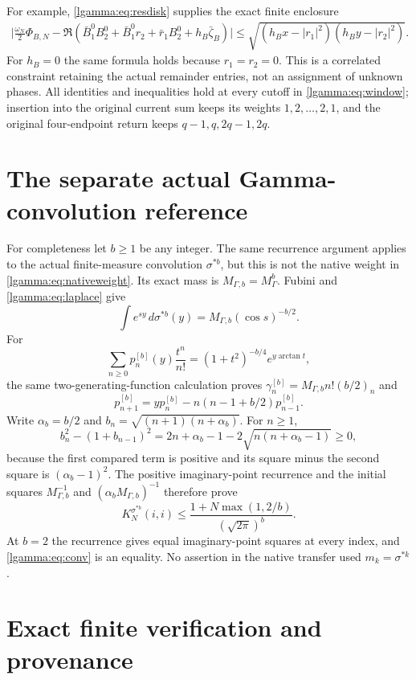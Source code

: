 \documentclass[11pt]{article}
\begin{document}
For example, \eqref{lgamma:eq:resdisk} supplies the exact finite enclosure
\begin{equation}\label{lgamma:eq:currentdisk}
 \begin{split}
 \Big|\frac{\omega_N}2\Phi_{B,N}
 -\Re(\bar B_1^0B_2^0+\bar B_1^0r_2+\bar r_1B_2^0
                   +h_B\bar\zeta_B)\Big|
 \le\sqrt{(h_Bx-|r_1|^2)(h_By-|r_2|^2)}.
 \end{split}
\end{equation}
For $h_B=0$ the same formula holds because $r_1=r_2=0$.
This is a correlated constraint retaining the actual remainder entries,
not an assignment of unknown phases.  All identities and inequalities
hold at every cutoff in \eqref{lgamma:eq:window}; insertion into the original
current sum keeps its weights $1,2,\ldots,2,1$, and the original
four-endpoint return keeps $q-1,q,2q-1,2q$.

\section{The separate actual Gamma-convolution reference}

For completeness let $b\ge1$ be any integer.  The same recurrence
argument applies to the actual finite-measure convolution $\sigma^{*b}$,
but this is not the native weight in \eqref{lgamma:eq:nativeweight}.  Its exact
mass is $M_{\Gamma,b}=M_\Gamma^b$.  Fubini and \eqref{lgamma:eq:laplace} give
\[
 \int e^{sy}\,d\sigma^{*b}(y)=M_{\Gamma,b}(\cos s)^{-b/2}.
\]
For
\[
 \sum_{n\ge0}p_n^{[b]}(y)\frac{t^n}{n!}
 =(1+t^2)^{-b/4}e^{y\arctan t},
\]
the same two-generating-function calculation proves
$\gamma_n^{[b]}=M_{\Gamma,b}n!(b/2)_n$ and
\[
 p_{n+1}^{[b]}=yp_n^{[b]}-n(n-1+b/2)p_{n-1}^{[b]}.
\]
Write $\alpha_b=b/2$ and $b_n=\sqrt{(n+1)(n+\alpha_b)}$.
For $n\ge1$,
\[
 b_n^2-(1+b_{n-1})^2
 =2n+\alpha_b-1-2\sqrt{n(n+\alpha_b-1)}\ge0,
\]
because the first compared term is positive and its square minus the
second square is $(\alpha_b-1)^2$.  The positive imaginary-point
recurrence and the initial squares $M_{\Gamma,b}^{-1}$ and
$(\alpha_bM_{\Gamma,b})^{-1}$ therefore prove
\begin{equation}\label{lgamma:eq:conv}
 K_N^{\sigma^{*b}}(i,i)
 \le\frac{1+N\max(1,2/b)}{(\sqrt{2\pi})^b}.
\end{equation}
At $b=2$ the recurrence gives equal imaginary-point squares at every
index, and \eqref{lgamma:eq:conv} is an equality.  No assertion in the native
transfer used $m_k=\sigma^{*k}$.

\section{Exact finite verification and provenance}
\end{document}
